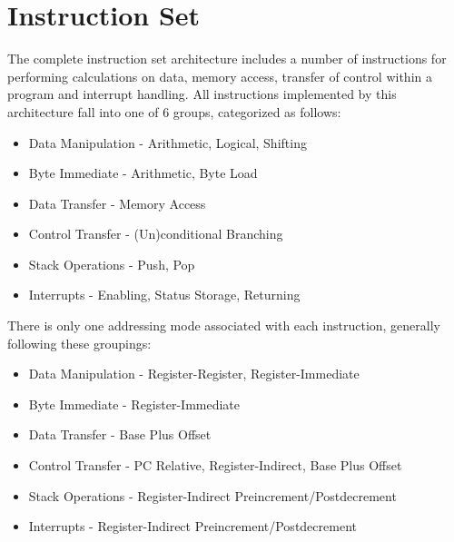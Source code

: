
\newpage
\section{Instruction Set}

The complete instruction set architecture includes a number of instructions for performing calculations on data, memory access, transfer of control within a program and interrupt handling.
\vspace{\baselineskip}
\noindent All instructions implemented by this architecture fall into one of 6 groups, categorized as follows:
\begin{itemize}
	\item Data Manipulation - Arithmetic, Logical, Shifting
	\item Byte Immediate - Arithmetic, Byte Load
	\item Data Transfer - Memory Access
	\item Control Transfer - (Un)conditional Branching
	\item Stack Operations - Push, Pop
	\item Interrupts - Enabling, Status Storage, Returning
\end{itemize}

\vspace{\baselineskip}
\noindent There is only one addressing mode associated with each instruction, generally following these groupings:
\begin{itemize}
	\item Data Manipulation - Register-Register, Register-Immediate
	\item Byte Immediate - Register-Immediate
	\item Data Transfer - Base Plus Offset
	\item Control Transfer - PC Relative, Register-Indirect, Base Plus Offset
	\item Stack Operations - Register-Indirect Preincrement/Postdecrement
	\item Interrupts - Register-Indirect Preincrement/Postdecrement
\end{itemize}
\vspace{\baselineskip}

